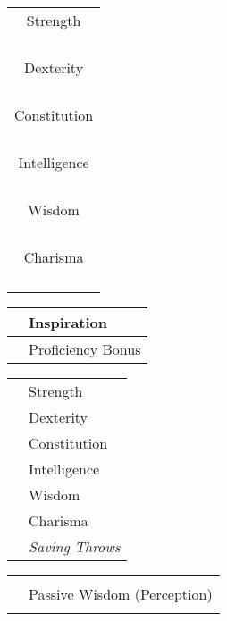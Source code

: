 \documentclass{article}
\begin{document}
\begin{multicols}{3}
  \begin{minipage}{.1\textwidth} %
    \begin{tabular}{|c|}
      \hline
      Strength\\
      \\\\\\\\\hline
      Dexterity\\
      \\\\\\\\\hline
      Constitution\\
      \\\\\\\\\hline
      Intelligence\\
      \\\\\\\\\hline
      Wisdom\\
      \\\\\\\\\hline
      Charisma\\
      \\\\\\\\\hline
    \end{tabular}
  \end{minipage}
  \begin{minipage}{.2\textwidth} %
    \begin{tabular}{|c|l|}
      \hline
      &Inspiration\\\hline
      &Proficiency Bonus\\\hline
    \end{tabular}
    \begin{tabular}{|cl|}
      \hline
      &Strength\\
      &Dexterity\\
      &Constitution\\
      &Intelligence\\
      &Wisdom\\
      &Charisma\\
      &\textit{\footnotesize{Saving Throws}}\\\hline
    \end{tabular}
  \end{minipage}
   \begin{tabular}{|m{}|m{}|}
     \hline
     &\\
     &Passive Wisdom (Perception)\\
     &\\\hline
   \end{tabular}


\end{multicols}
\end{document}
